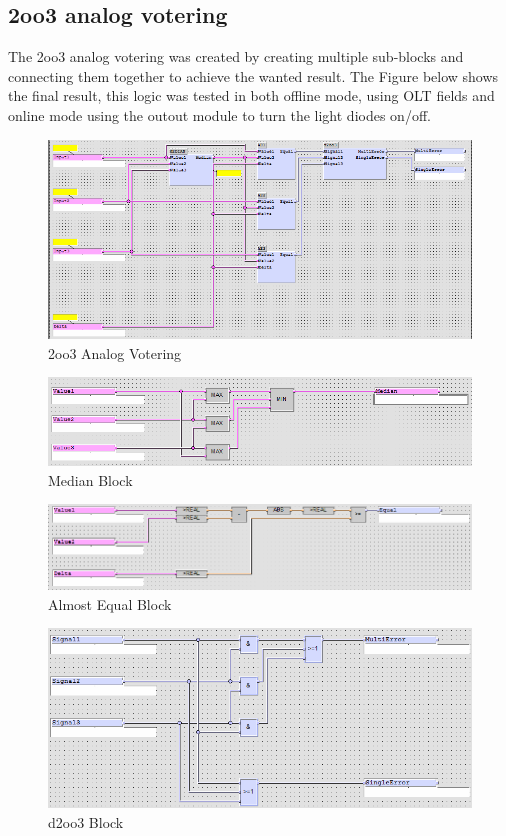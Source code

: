 \subsection{2oo3 analog votering}
The 2oo3 analog votering was created by creating multiple sub-blocks and connecting them together to achieve the wanted result. The Figure below shows the final result, this logic was tested in both offline mode, using OLT fields and online mode using the outout module to turn the light diodes on/off.
\begin{figure}[!htb]
    \centering
    \includegraphics[scale=0.55]{images/A2oo3}
     \caption{2oo3 Analog Votering}
\end{figure}

\begin{figure}[!htb]
    \centering
    \includegraphics[scale=0.4]{images/Median}
     \caption{Median Block}
\end{figure}

\begin{figure}[!htb]
    \centering
    \includegraphics[scale=0.45]{images/AE}
     \caption{Almost Equal Block}
\end{figure}

\begin{figure}[!htb]
    \centering
    \includegraphics[scale=0.45]{images/d2oo3}
     \caption{d2oo3 Block}
\end{figure}

